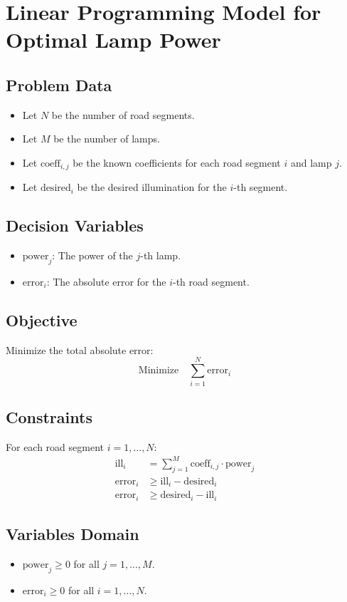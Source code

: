 \documentclass{article}
\begin{document}
\section*{Linear Programming Model for Optimal Lamp Power}

\subsection*{Problem Data}
\begin{itemize}
    \item Let \( N \) be the number of road segments.
    \item Let \( M \) be the number of lamps.
    \item Let \( \text{coeff}_{i,j} \) be the known coefficients for each road segment \( i \) and lamp \( j \).
    \item Let \( \text{desired}_i \) be the desired illumination for the \( i \)-th segment.
\end{itemize}

\subsection*{Decision Variables}
\begin{itemize}
    \item \( \text{power}_j \): The power of the \( j \)-th lamp.
    \item \( \text{error}_i \): The absolute error for the \( i \)-th road segment.
\end{itemize}

\subsection*{Objective}
Minimize the total absolute error:
\[
\text{Minimize} \quad \sum_{i=1}^{N} \text{error}_i
\]

\subsection*{Constraints}
For each road segment \( i = 1, \ldots, N \):
\begin{align*}
    \text{ill}_i &= \sum_{j=1}^{M} \text{coeff}_{i,j} \cdot \text{power}_j \\
    \text{error}_i &\geq \text{ill}_i - \text{desired}_i \\
    \text{error}_i &\geq \text{desired}_i - \text{ill}_i
\end{align*}

\subsection*{Variables Domain}
\begin{itemize}
    \item \( \text{power}_j \geq 0 \) for all \( j = 1, \ldots, M \).
    \item \( \text{error}_i \geq 0 \) for all \( i = 1, \ldots, N \).
\end{itemize}
\end{document}
